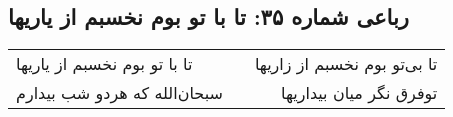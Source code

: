\begin{center}
\section*{رباعی شماره ۳۵: تا با تو بوم نخسبم از یاریها}
\label{sec:0035}
\begin{longtable}{l p{0.5cm} r}
تا با تو بوم نخسبم از یاریها
&&
تا بی‌تو بوم نخسبم از زاریها
\\
سبحان‌الله که هردو شب بیدارم
&&
توفرق نگر میان بیداریها
\\
\end{longtable}
\end{center}
